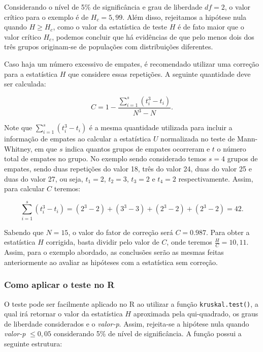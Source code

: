 \documentclass[
  letterpaper,
  DIV=11,
  numbers=noendperiod]{scrreprt}
\begin{document}
Considerando o nível de 5\% de significância e grau de liberdade
\(df = 2\), o valor crítico para o exemplo é de \(H_c = 5,99\). Além
disso, rejeitamos a hipótese nula quando \(H \geq H_c\), como o valor da
estatística de teste \(H\) é de fato maior que o valor crítico \(H_c\),
podemos concluir que há evidências de que pelo menos dois dos três
grupos originam-se de populações com distribuições diferentes.

Caso haja um número excessivo de empates, é recomendado utilizar uma
correção para a estatística \(H\) que considere essas repetições. A
seguinte quantidade deve ser calculada:

\[C=1-\displaystyle \frac{\sum_{i=1}^s\left(t_i^3-t_i\right)}{N^3-N}.\]

Note que \(\sum_{i=1}^s\left(t_i^3-t_i\right)\) é a mesma quantidade
utilizada para incluir a informação de empates ao calcular a estatística
\(U\) normalizada no teste de Mann-Whitney, em que \(s\) indica quantos
grupos de empates ocorreram e \(t\) o número total de empates no grupo.
No exemplo sendo considerado temos \(s = 4\) grupos de empates, sendo
duas repetições do valor 18, três do valor 24, duas do valor 25 e duas
do valor 27, ou seja, \(t_1 = 2\), \(t_2 = 3\), \(t_3 = 2\) e
\(t_4 = 2\) respectivamente. Assim, para calcular \(C\) teremos:

\[\sum_{i=1}^s\left(t_i^3-t_i\right) = (2^3-2) + (3^3-3) + (2^3-2) + (2^3-2) = 42.\]

Sabendo que \(N = 15\), o valor do fator de correção será \(C = 0.987\).
Para obter a estatística \(H\) corrigida, basta dividir pelo valor de
\(C\), onde teremos \(\displaystyle \frac{H}{C} = 10,11\). Assim, para o
exemplo abordado, as conclusões serão as mesmas feitas anteriormente ao
avaliar as hipóteses com a estatística sem correção.

\hypertarget{como-aplicar-o-teste-no-r-2}{%
\subsubsection{Como aplicar o teste no
R}\label{como-aplicar-o-teste-no-r-2}}

O teste pode ser facilmente aplicado no R ao utilizar a função
\texttt{kruskal.test()}, a qual irá retornar o valor da estatística
\(H\) aproximada pela qui-quadrado, os graus de liberdade considerados e
o \emph{valor-p}. Assim, rejeita-se a hipótese nula quando
\emph{valor-p} \(\leq 0,05\) considerando 5\% de nível de significância.
A função possui a seguinte estrutura:
\end{document}
